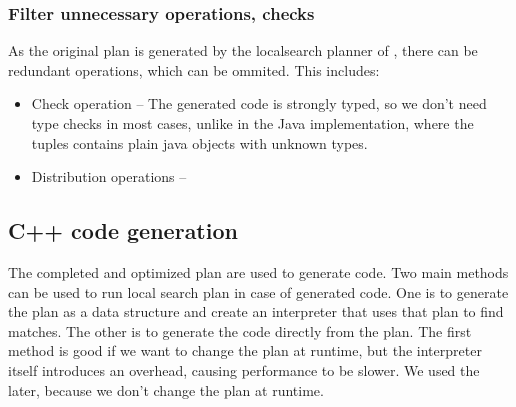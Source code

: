 \subsubsection{Filter unnecessary operations, checks}
As the original plan is generated by the localsearch planner of \viatra{}, there can be redundant operations, which can be ommited. This includes:

\begin{itemize}
	\item Check operation -- The generated code is strongly typed, so we don't need type checks in most cases, unlike in the Java implementation, where the tuples contains plain java objects with unknown types.
	
	\item Distribution operations -- 
\end{itemize}



\subsection{C++ code generation}

The completed and optimized plan are used to generate \cpp{} code. 
Two main methods can be used to run local search plan in case of generated code. 
One is to generate the plan as a data structure and create an interpreter that uses that plan to find matches. 
The other is to generate the code directly from the plan. 
The first method is good if we want to change the plan at runtime, but the interpreter itself introduces an overhead, causing performance to be slower.
We used the later, because we don't change the plan at runtime.












